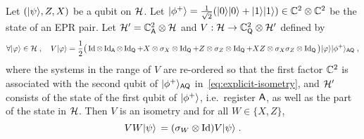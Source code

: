 \begin{proposition}\label{prop:explicit-iso}
Let $(|\psi\rangle,Z,X)$ be a qubit on $\mathcal{H}$. Let $|\phi^+\rangle = \frac{1}{\sqrt{2}} (|0\rangle|0\rangle + |1\rangle|1\rangle)\in \mathbb{C}^2 \otimes \mathbb{C}^2$ be the state of an EPR pair. Let $\mathcal{H}'= \mathbb{C}^2_{\textsf{A}} \otimes \mathcal{H}$ and $V: \mathcal{H} \to \mathbb{C}^2_{\textsf{Q}} \otimes \mathcal{H}'$ defined by
\begin{equation}\label{eq:explicit-isometry}
 \forall |\varphi\rangle \in \mathcal{H}\;,\quad V|\varphi\rangle = \frac{1}{2}\big(\mathop{\rm Id}\nolimits \otimes \mathop{\rm Id}\nolimits_{\textsf{A}}\otimes \mathop{\rm Id}\nolimits_{\textsf{Q}} + X \otimes \sigma_X \otimes \mathop{\rm Id}\nolimits_{\textsf{Q}} + Z \otimes \sigma_Z \otimes \mathop{\rm Id}\nolimits_{\textsf{Q}} + XZ \otimes \sigma_X\sigma_Z \otimes \mathop{\rm Id}\nolimits_{\textsf{Q}}\big) |\varphi\rangle |\phi^+\rangle_{{\textsf{AQ}}}\;,
\end{equation}
where the systems in the range of $V$ are re-ordered so that the first factor $\mathbb{C}^2$ is associated with the second qubit of $|\phi^+\rangle_{{\textsf{AQ}}}$ in~\eqref{eq:explicit-isometry}, and $\mathcal{H}'$ consists of the state of the first qubit of $|\phi^+\rangle$, i.e.\ register ${\textsf{A}}$, as well as the part of the state in $\mathcal{H}$.  
Then $V$ is an isometry and for all $W\in\{X,Z\}$,
\begin{equation}\label{eq:explicit-isometry-2}
VW |\psi\rangle\, = (\sigma_W \otimes \mathop{\rm Id}\nolimits) V |\psi\rangle\;.
\end{equation}
\end{proposition}


